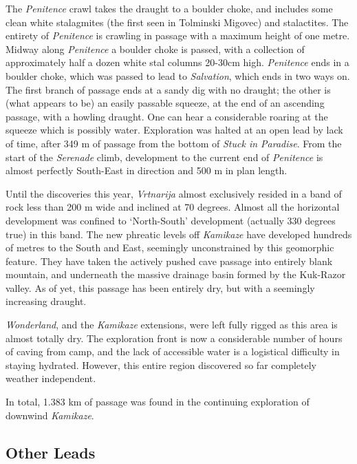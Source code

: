 The \emph{Penitence} crawl  takes the
draught to a boulder choke, and includes some clean white stalagmites
(the first seen in Tolminski Migovec) and stalactites. The entirety of
\emph{Penitence} is crawling in passage with a maximum height of one
metre. Midway along \emph{Penitence} a boulder choke is passed, with a
collection of approximately half a dozen white stal columns 20-30cm
high. \emph{Penitence} ends in a boulder choke, which was passed to lead
to \emph{Salvation}, which ends in two ways on. The first branch of
passage ends at a sandy dig with no draught; the other is (what appears
to be) an easily passable squeeze, at the end of an ascending passage,
with a howling draught. One can hear a considerable roaring at the
squeeze which is possibly water. Exploration was halted at an open lead
by lack of time, after 349 m of passage from the bottom of \emph{Stuck
in Paradise}. From the start of the \emph{Serenade} climb, development
to the current end of \emph{Penitence} is almost perfectly South-East in
direction and 500 m in plan length.

Until the discoveries this year, \emph{Vrtnarija} almost exclusively
resided in a band of rock less than 200 m wide and inclined at 70
degrees. Almost all the horizontal development was confined to
`North-South' development (actually 330 degrees true) in this band. The
new phreatic levels off \emph{Kamikaze} have developed hundreds of
metres to the South and East, seemingly unconstrained by this geomorphic
feature. They have taken the actively pushed cave passage into entirely
blank mountain, and underneath the massive drainage basin formed by the
Kuk-Razor valley. As of yet, this passage has been entirely dry, but
with a seemingly increasing draught.

\emph{Wonderland}, and the \emph{Kamikaze} extensions, were left fully
rigged as this area is almost totally dry. The exploration front is now
a considerable number of hours of caving from camp, and the lack of
accessible water is a logistical difficulty in staying hydrated.
However, this entire region discovered so far completely weather
independent.

In total, 1.383 km of passage was found in the continuing exploration of
downwind \emph{Kamikaze}.

\hypertarget{other-leads}{%
\subsection{Other Leads}\label{other-leads}}

